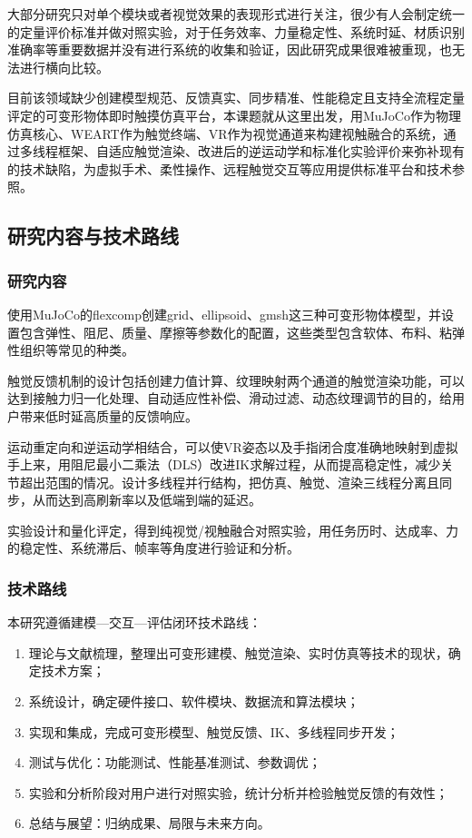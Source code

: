 大部分研究只对单个模块或者视觉效果的表现形式进行关注，很少有人会制定统一的定量评价标准并做对照实验，对于任务效率、力量稳定性、系统时延、材质识别准确率等重要数据并没有进行系统的收集和验证，因此研究成果很难被重现，也无法进行横向比较。

目前该领域缺少创建模型规范、反馈真实、同步精准、性能稳定且支持全流程定量评定的可变形物体即时触摸仿真平台，本课题就从这里出发，用MuJoCo作为物理仿真核心、WEART作为触觉终端、VR作为视觉通道来构建视触融合的系统，通过多线程框架、自适应触觉渲染、改进后的逆运动学和标准化实验评价来弥补现有的技术缺陷，为虚拟手术、柔性操作、远程触觉交互等应用提供标准平台和技术参照。

\subsection{研究内容与技术路线}

\subsubsection{研究内容}
使用MuJoCo的flexcomp创建grid、ellipsoid、gmsh这三种可变形物体模型，并设置包含弹性、阻尼、质量、摩擦等参数化的配置，这些类型包含软体、布料、粘弹性组织等常见的种类。

触觉反馈机制的设计包括创建力值计算、纹理映射两个通道的触觉渲染功能，可以达到接触力归一化处理、自动适应性补偿、滑动过滤、动态纹理调节的目的，给用户带来低时延高质量的反馈响应。

运动重定向和逆运动学相结合，可以使VR姿态以及手指闭合度准确地映射到虚拟手上来，用阻尼最小二乘法（DLS）改进IK求解过程，从而提高稳定性，减少关节超出范围的情况。设计多线程并行结构，把仿真、触觉、渲染三线程分离且同步，从而达到高刷新率以及低端到端的延迟。

实验设计和量化评定，得到纯视觉/视触融合对照实验，用任务历时、达成率、力的稳定性、系统滞后、帧率等角度进行验证和分析。

\subsubsection{技术路线}
本研究遵循建模---交互---评估闭环技术路线：

\begin{enumerate}
    \item 理论与文献梳理，整理出可变形建模、触觉渲染、实时仿真等技术的现状，确定技术方案；
    \item 系统设计，确定硬件接口、软件模块、数据流和算法模块；
    \item 实现和集成，完成可变形模型、触觉反馈、IK、多线程同步开发；
    \item 测试与优化：功能测试、性能基准测试、参数调优；
    \item 实验和分析阶段对用户进行对照实验，统计分析并检验触觉反馈的有效性；
    \item 总结与展望：归纳成果、局限与未来方向。
\end{enumerate}

